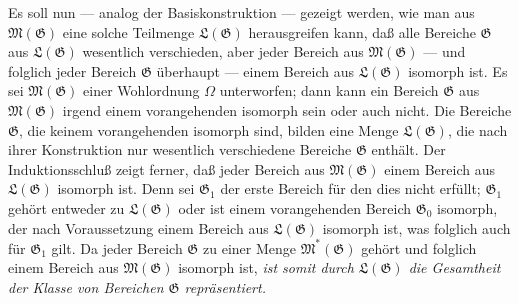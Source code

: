 \documentclass[11pt]{article}
\begin{document}
Es soll nun --- analog der Basiskonstruktion --- gezeigt werden, wie man aus
$\mathfrak M(\mathfrak G)$ eine solche Teilmenge $\mathfrak L(\mathfrak G)$
herausgreifen kann, daß alle Bereiche $\mathfrak G$ aus
$\mathfrak L(\mathfrak G)$ wesentlich verschieden, aber jeder Bereich aus
$\mathfrak M(\mathfrak G)$ --- und folglich jeder Bereich $\mathfrak G$
überhaupt --- einem Bereich aus $\mathfrak L(\mathfrak G)$ isomorph ist. Es sei
$\mathfrak M(\mathfrak G)$ einer Wohlordnung $\Omega$ unterworfen; dann kann
ein Bereich $\mathfrak G$ aus $\mathfrak M(\mathfrak G)$ irgend einem
vorangehenden isomorph sein oder auch nicht. Die Bereiche $\mathfrak G$, die
keinem vorangehenden isomorph sind, bilden eine Menge $\mathfrak L(\mathfrak G)$,
die nach ihrer Konstruktion nur wesentlich verschiedene Bereiche $\mathfrak G$
enthält. Der Induktionsschluß zeigt ferner, daß jeder Bereich aus
$\mathfrak M(\mathfrak G)$ einem Bereich aus $\mathfrak L(\mathfrak G)$ isomorph
ist. Denn sei $\mathfrak G_1$ der erste Bereich für den dies nicht erfüllt;
$\mathfrak G_1$ gehört entweder zu $\mathfrak L(\mathfrak G)$ oder ist einem
vorangehenden Bereich $\mathfrak G_0$ isomorph, der nach Voraussetzung einem
Bereich aus $\mathfrak L(\mathfrak G)$ isomorph ist, was folglich auch für
$\mathfrak G_1$ gilt. Da jeder Bereich $\mathfrak G$ zu einer Menge
$\mathfrak M^*(\mathfrak G)$ gehört und folglich einem Bereich aus
$\mathfrak M(\mathfrak G)$ isomorph ist, \emph{ist somit durch
$\mathfrak L(\mathfrak G)$ die Gesamtheit der Klasse von Bereichen
$\mathfrak G$ repräsentiert.}
\end{document}
